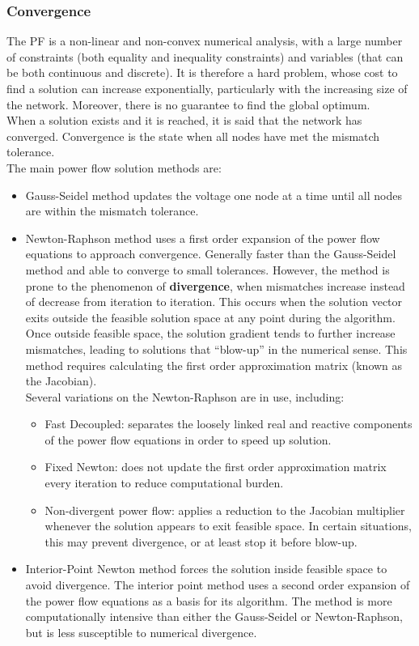 \subsubsection{Convergence}
The \gls{PF} is a non-linear and non-convex numerical analysis, with a large number of constraints (both equality and inequality constraints) and variables (that can be both continuous and discrete). It is therefore a hard problem, whose cost to find a solution can increase exponentially, particularly with the increasing size of the network. Moreover, there is no guarantee to find the global optimum. \\
When a solution exists and it is reached, it is said that the network has converged. Convergence is the state when all nodes have met the mismatch tolerance. \\
The main power flow solution methods are:
\begin{itemize}
    \item Gauss-Seidel method updates the voltage one node at a time until all nodes are within the mismatch tolerance.
    
    \item Newton-Raphson method uses a first order expansion of the power flow equations to approach convergence. Generally faster than the Gauss-Seidel method and able to converge to small tolerances. However, the method is prone to the phenomenon of \textbf{divergence}, when mismatches increase instead of decrease from iteration to iteration. This occurs when the solution vector exits outside the feasible solution space at any point during the algorithm. Once outside feasible space, the solution gradient tends to further increase mismatches, leading to solutions that “blow-up” in the numerical sense. This method requires calculating the first order approximation matrix (known as the Jacobian). \\
    Several variations on the Newton-Raphson are in use, including:
        \begin{itemize}
            \item[] Fast Decoupled: separates the loosely linked real and reactive components of the power flow equations in order to speed up solution.
            \item[] Fixed Newton: does not update the first order approximation matrix every iteration to reduce computational burden.
            \item[] Non-divergent power flow: applies a reduction to the Jacobian multiplier whenever the solution appears to exit feasible space. In certain situations, this may prevent divergence, or at least stop it before blow-up.
        \end{itemize}
    \item Interior-Point Newton method forces the solution inside feasible space to avoid divergence. The interior point method uses a second order expansion of the power flow equations as a basis for its algorithm. The method is more computationally intensive than either the Gauss-Seidel or Newton-Raphson, but is less susceptible to numerical divergence.
\end{itemize}

